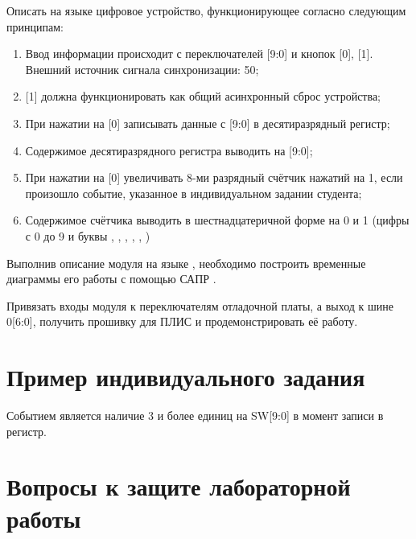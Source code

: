 \par{Описать на языке  цифровое устройство, функционирующее согласно следующим принципам:
\begin{enumerate}[noitemsep,topsep=0pt, after=\vspace{2pt}]
  \item Ввод информации происходит с переключателей [9:0] и кнопок [0], [1]. Внешний источник сигнала синхронизации: 50;
  \item {}[1] должна функционировать как общий асинхронный сброс устройства;
  \item При нажатии на [0] записывать данные с [9:0] в десятиразрядный регистр;
  \item Содержимое десятиразрядного регистра выводить на [9:0];
  \item При нажатии на [0] увеличивать 8-ми разрядный счётчик нажатий на 1, если произошло событие, указанное в индивидуальном задании студента;
  \item Содержимое счётчика выводить в шестнадцатеричной форме на 0 и 1 (цифры с 0 до 9 и буквы , , , , , )
\end{enumerate}}

\par{Выполнив описание модуля на языке , необходимо построить временные диаграммы его работы с помощью САПР .}

\par{Привязать входы модуля к переключателям  отладочной платы, а выход к шине 0[6:0], получить прошивку для ПЛИС и продемонстрировать её работу.}

\section{Пример индивидуального задания}

\par{Событием является наличие 3 и более единиц на SW[9:0] в момент записи в регистр.}



\section{Вопросы к защите лабораторной работы}

